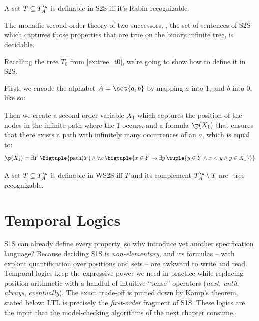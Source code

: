 \documentclass[oneside]{academica}
\begin{document}
\begin{theorem*}[S2S definability]
  A set $T \subseteq \Twa$ is definable in S2S iff it's Rabin recognizable.
\end{theorem*}

\begin{theorem*}[S2S decidability]
  The monadic second-order theory of two-successors, \ie, the set of sentences of S2S which captures those properties that are true on the binary infinite tree, is decidable.
\end{theorem*}

Recalling the tree $T_0$ from \autoref{ex:tree_t0}, we're going to show how to define it in S2S.

First, we encode the alphabet $A = \set{a,b}$ by mapping $a$ into $1$, and $b$ into $0$, like so:
\begin{center}
  
\end{center}
Then we create a second-order variable $X_1$ which captures the position of the nodes in the infinite path where the $1$ occurs, and a formula $\p (X_1)$ that ensures that there exists a path with infinitely many occurrences of an $a$, which is equal to:
\begin{equation*}
  \p (X_1) = \exists Y\, \Bigtuple{\text{path}(Y) \land \forall x\, \bigtuple{x \in Y \to \exists y\, \tuple{y \in Y \land x<y \land y \in X_1}}}
\end{equation*}

\begin{theorem*}
  A set $T \subseteq \Twa$ is definable in WS2S iff $T$ and its complement $\Twa \setminus T$ are \Buchi-tree recognizable.
  \vspace{-15pt}
  \begin{center}
    
  \end{center}
\end{theorem*}

\chapter{Temporal Logics}

S1S can already define every \wreg property, so why introduce yet another specification language? Because deciding S1S is \emph{non-elementary}, and its formulas -- with explicit quantification over positions and sets -- are awkward to write and read. Temporal logics keep the expressive power we need in practice while replacing position arithmetic with a handful of intuitive ``tense'' operators (\emph{next}, \emph{until}, \emph{always}, \emph{eventually}). The exact trade-off is pinned down by Kamp's theorem, stated below: LTL is precisely the \emph{first-order} fragment of S1S. These logics are the input that the model-checking algorithms of the next chapter consume.
\end{document}
